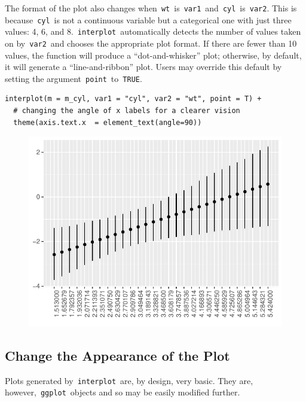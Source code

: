 \documentclass[
  article]{jss}
\begin{document}
The format of the plot also changes
when~\texttt{wt}~is~\texttt{var1}~and~\texttt{cyl}~is~\texttt{var2}.
This is because~\texttt{cyl}~is not a continuous variable but a
categorical one with just three values: 4, 6, and
8.~\texttt{interplot}~automatically detects the number of values taken
on by~\texttt{var2}~and chooses the appropriate plot format. If there
are fewer than 10 values, the function will produce a
``dot-and-whisker'' plot; otherwise, by default, it will generate a
``line-and-ribbon'' plot. Users may override this default by setting the
argument~\texttt{point}~to~\texttt{TRUE}.

\begin{verbatim}
interplot(m = m_cyl, var1 = "cyl", var2 = "wt", point = T) +
  # changing the angle of x labels for a clearer vision
  theme(axis.text.x  = element_text(angle=90))
\end{verbatim}

\begin{figure}[H]

{\centering \includegraphics{jss_manuscript_files/figure-pdf/unnamed-chunk-6-1.pdf}

}

\end{figure}

\hypertarget{change-the-appearance-of-the-plot}{%
\subsection{Change the Appearance of the
Plot}\label{change-the-appearance-of-the-plot}}

Plots generated by~\texttt{interplot}~are, by design, very basic. They
are, however,~\texttt{ggplot}~objects and so may be easily modified
further.
\end{document}
